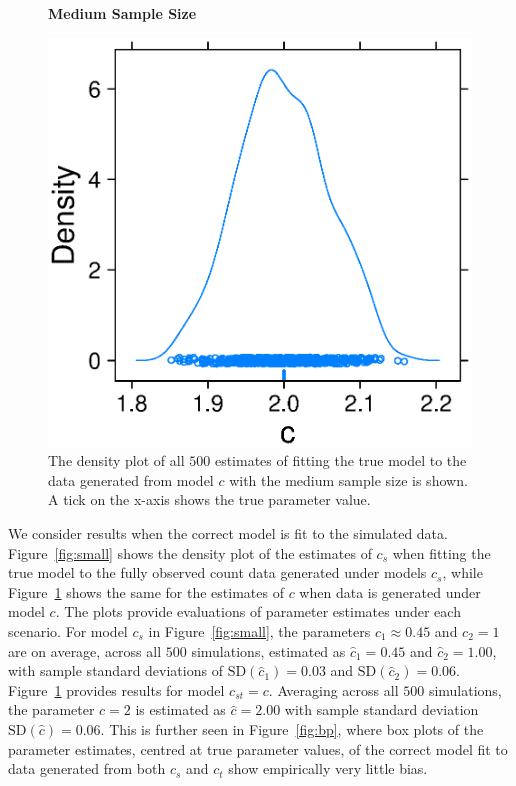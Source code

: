 \documentclass[12pt]{article}
\begin{document}
\begin{figure}
  \textbf{Medium Sample Size}\par
  \centering
  \includegraphics[scale=0.75]{medium}
  \caption{The density plot of all $500$ estimates of fitting the true model to the data generated from model $c$ with the medium sample size is shown.  A tick on the x-axis shows the true parameter value.}
  \label{fig:medium}
\end{figure}

We consider results when the correct model is fit to the simulated data.  Figure~\ref{fig:small} shows the density plot of the estimates of $c_s$ when fitting the true model to the fully observed count data generated under models $c_s$, while Figure~\ref{fig:medium} shows the same for the estimates of $c$ when data is generated under model $c$.  The plots provide evaluations of parameter estimates under each scenario.  For model $c_s$ in Figure~\ref{fig:small}, the parameters $c_1 \approx 0.45$ and $c_2 = 1$ are on average, across all $500$ simulations, estimated as $\hat{c}_1 = 0.45$ and $\hat{c}_2 = 1.00$, with sample standard deviations of $\text{SD}(\hat{c}_1) = 0.03$ and $\text{SD}(\hat{c}_2) = 0.06$.  Figure~\ref{fig:medium} provides results for model $c_{st} = c$.  Averaging across all $500$ simulations, the parameter $c=2$ is estimated as $\hat{c} = 2.00$ with sample standard deviation $\text{SD}(\hat{c})=0.06$.  This is further seen in Figure~\ref{fig:bp}, where box plots of the parameter estimates, centred at true parameter values, of the correct model fit to data generated from both $c_s$ and $c_t$ show empirically very little bias.
\end{document}
